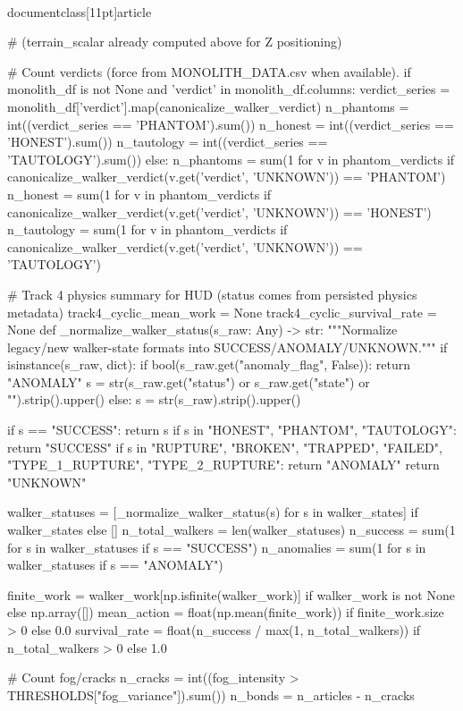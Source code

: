 \\documentclass[11pt]{article}
\begin{document}
\begin{CodeBlock}
{{{{{    # (terrain_scalar already computed above for Z positioning)

    # Count verdicts (force from MONOLITH_DATA.csv when available).
    if monolith_df is not None and 'verdict' in monolith_df.columns:
        verdict_series = monolith_df['verdict'].map(canonicalize_walker_verdict)
        n_phantoms = int((verdict_series == 'PHANTOM').sum())
        n_honest = int((verdict_series == 'HONEST').sum())
        n_tautology = int((verdict_series == 'TAUTOLOGY').sum())
    else:
        n_phantoms = sum(1 for v in phantom_verdicts if canonicalize_walker_verdict(v.get('verdict', 'UNKNOWN')) == 'PHANTOM')
        n_honest = sum(1 for v in phantom_verdicts if canonicalize_walker_verdict(v.get('verdict', 'UNKNOWN')) == 'HONEST')
        n_tautology = sum(1 for v in phantom_verdicts if canonicalize_walker_verdict(v.get('verdict', 'UNKNOWN')) == 'TAUTOLOGY')

    # Track 4 physics summary for HUD (status comes from persisted physics metadata)
    track4_cyclic_mean_work = None
    track4_cyclic_survival_rate = None
    def _normalize_walker_status(s_raw: Any) -> str:
        """Normalize legacy/new walker-state formats into SUCCESS/ANOMALY/UNKNOWN."""
        if isinstance(s_raw, dict):
            if bool(s_raw.get("anomaly_flag", False)):
                return "ANOMALY"
            s = str(s_raw.get("status") or s_raw.get("state") or "").strip().upper()
        else:
            s = str(s_raw).strip().upper()

        if s == "SUCCESS":
            return s
        if s in {"HONEST", "PHANTOM", "TAUTOLOGY"}:
            return "SUCCESS"
        if s in {"RUPTURE", "BROKEN", "TRAPPED", "FAILED", "TYPE_1_RUPTURE", "TYPE_2_RUPTURE"}:
            return "ANOMALY"
        return "UNKNOWN"

    walker_statuses = [_normalize_walker_status(s) for s in walker_states] if walker_states else []
    n_total_walkers = len(walker_statuses)
    n_success = sum(1 for s in walker_statuses if s == "SUCCESS")
    n_anomalies = sum(1 for s in walker_statuses if s == "ANOMALY")

    finite_work = walker_work[np.isfinite(walker_work)] if walker_work is not None else np.array([])
    mean_action = float(np.mean(finite_work)) if finite_work.size > 0 else 0.0
    survival_rate = float(n_success / max(1, n_total_walkers)) if n_total_walkers > 0 else 1.0

    # Count fog/cracks
    n_cracks = int((fog_intensity > THRESHOLDS["fog_variance"]).sum())
    n_bonds = n_articles - n_cracks

}}}}}
\end{CodeBlock}
\end{document}
